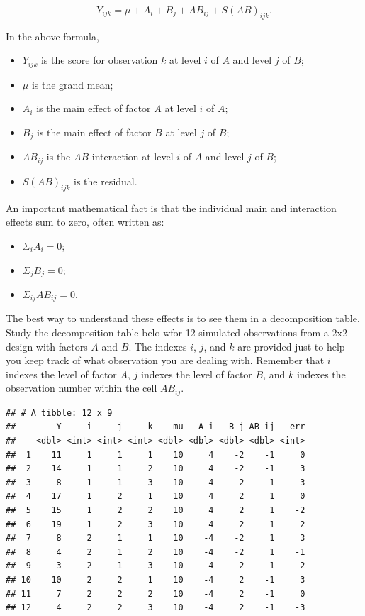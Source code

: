 \documentclass[]{book}
\providecommand{\tightlist}{%
  \setlength{\itemsep}{0pt}\setlength{\parskip}{0pt}}
\begin{document}
\[Y_{ijk} = \mu + A_i + B_j + AB_{ij} + S(AB)_{ijk}.\]

In the above formula,

\begin{itemize}
\tightlist
\item
  \(Y_{ijk}\) is the score for observation \(k\) at level \(i\) of \(A\) and level \(j\) of \(B\);
\item
  \(\mu\) is the grand mean;
\item
  \(A_i\) is the main effect of factor \(A\) at level \(i\) of \(A\);
\item
  \(B_j\) is the main effect of factor \(B\) at level \(j\) of \(B\);
\item
  \(AB_{ij}\) is the \(AB\) interaction at level \(i\) of \(A\) and level \(j\) of \(B\);
\item
  \(S(AB)_{ijk}\) is the residual.
\end{itemize}

An important mathematical fact is that the individual main and interaction effects sum to zero, often written as:

\begin{itemize}
\tightlist
\item
  \(\Sigma_i A_i = 0\);
\item
  \(\Sigma_j B_j = 0\);
\item
  \(\Sigma_{ij} AB_{ij} = 0\).
\end{itemize}

The best way to understand these effects is to see them in a decomposition table. Study the decomposition table belo wfor 12 simulated observations from a 2x2 design with factors \(A\) and \(B\). The indexes \(i\), \(j\), and \(k\) are provided just to help you keep track of what observation you are dealing with. Remember that \(i\) indexes the level of factor \(A\), \(j\) indexes the level of factor \(B\), and \(k\) indexes the observation number within the cell \(AB_{ij}\).

\begin{verbatim}
## # A tibble: 12 x 9
##        Y     i     j     k    mu   A_i   B_j AB_ij   err
##    <dbl> <int> <int> <int> <dbl> <dbl> <dbl> <dbl> <int>
##  1    11     1     1     1    10     4    -2    -1     0
##  2    14     1     1     2    10     4    -2    -1     3
##  3     8     1     1     3    10     4    -2    -1    -3
##  4    17     1     2     1    10     4     2     1     0
##  5    15     1     2     2    10     4     2     1    -2
##  6    19     1     2     3    10     4     2     1     2
##  7     8     2     1     1    10    -4    -2     1     3
##  8     4     2     1     2    10    -4    -2     1    -1
##  9     3     2     1     3    10    -4    -2     1    -2
## 10    10     2     2     1    10    -4     2    -1     3
## 11     7     2     2     2    10    -4     2    -1     0
## 12     4     2     2     3    10    -4     2    -1    -3
\end{verbatim}
\end{document}
